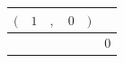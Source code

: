 {\scriptsize\setlength{\tabcolsep}{1.5pt}%
\begin{tabular}{ccccc|l}
$($ & $\text{1}$ & $,$ & $\text{0}$ & $)$ & \\ \hline
\gcell{$$} & \gcell{$$} & \gcell{$\posC{\circ}$} & \gcell{$\posD{\bullet}$} & \gcell{$$} & $\text{0}$ \\
\end{tabular}}
